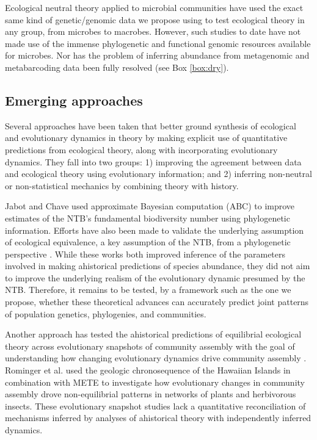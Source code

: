 \documentclass[12pt]{article}
\newcounter{Box}
\begin{document}
Ecological neutral theory applied to microbial communities
\citep{Venkataraman2015-rk} have used the exact same kind of
genetic/genomic data we propose using to test ecological theory
in any group, from microbes to macrobes. However, such studies to date
have not made use of the immense phylogenetic and functional genomic
resources available for microbes. Nor has the problem of inferring
abundance from metagenomic and metabarcoding data been fully resolved
(see Box \ref{box:dry}).

\subsection{Emerging approaches}

Several approaches have been taken that better ground synthesis of
ecological and evolutionary dynamics in theory by making
explicit use of quantitative predictions from ecological theory,
along with incorporating evolutionary dynamics. They
fall into two groups: 1) improving the agreement between data and
ecological theory using evolutionary information; and 2) inferring
non-neutral or non-statistical mechanics by combining theory with
history. 

Jabot and Chave \citep{Jabot2009-xr} used approximate Bayesian
computation (ABC) to improve estimates of the NTB's fundamental
% 
% 
biodiversity number using phylogenetic information. Efforts have also
been made to validate the underlying assumption of ecological
equivalence, a key assumption of the NTB, from a phylogenetic
perspective \citep{Burbrink2015-vx}. While these works both improved
inference of the parameters involved in making ahistorical predictions
of species abundance, they did not aim to improve the underlying
realism of the evolutionary dynamic presumed by the NTB. Therefore, it remains to be tested, by a
framework such as the one we propose, whether these theoretical
advances can accurately predict joint patterns of population genetics,
phylogenies, and communities.

Another approach has tested the ahistorical predictions of equilibrial
ecological theory across evolutionary snapshots of community assembly
with the goal of understanding how changing evolutionary dynamics
drive community assembly \citep{Olszewski2004-ud,
  Wagner2006-te}. Rominger et
al. \citep{Rominger2015-kb} used the geologic chronosequence of the
Hawaiian Islands in combination with METE to investigate how
evolutionary changes in community assembly drove non-equilibrial
patterns in networks of plants and herbivorous insects.  These evolutionary snapshot studies lack a
quantitative reconciliation of mechanisms inferred by analyses of
ahistorical theory with independently inferred dynamics. 
\end{document}
